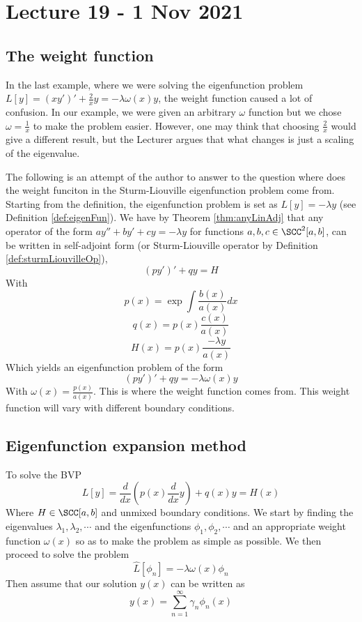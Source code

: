 \section{Lecture 19 - 1 Nov 2021}
\subsection{The weight function}
In the last example, where we were solving the eigenfunction problem
$L[y]=(xy')'+\frac{2}{x}y=-\lambda\omega(x)y$, the weight function caused a lot of
confusion. In our example, we were given an arbitrary $\omega$ function but we chose
$\omega=\frac{1}{x}$ to make the problem easier. However, one may think that choosing
$\frac{2}{x}$ would give a different result, but the Lecturer argues that what changes
is just a scaling of the eigenvalue.

The following is an attempt of the author to answer to the question where does the weight
funciton in the Sturm-Liouville eigenfunction problem come from. 
Starting from the definition, the eigenfunction problem is set as $L[y]=-\lambda y$
(see Definition \ref{def:eigenFun}). We have by Theorem \ref{thm:anyLinAdj} that any
operator of the form $ay''+by'+cy=-\lambda y$ for functions $a,b,c\in \SCC^2[a,b]$,
can be written in self-adjoint form (or Sturm-Liouville operator by Definition
\ref{def:sturmLiouvilleOp}),
\[(py')'+qy=H\]
With 
\[p(x)=\exp{\int\frac{b(x)}{a(x)}dx}\]
\[q(x)=p(x)\frac{c(x)}{a(x)}\]
\[H(x)=p(x)\frac{-\lambda y}{a(x)}\]
Which yields an eigenfunction problem of the form 
\[(py')'+qy=-\lambda \omega(x) y\]
With $\omega(x)=\frac{p(x)}{a(x)}$. This is where the weight function comes from. This
weight function will vary with different boundary conditions. 

\subsection{Eigenfunction expansion method}
To solve the BVP
\[L[y]=\frac{d}{dx}(p(x)\frac{d}{dx}y) + q(x) y = H(x)\]
Where $H\in\SCC[a,b]$ and unmixed boundary conditions. We start by finding the
eigenvalues $\lambda_1,\lambda_2,\cdots$ and the eigenfunctions $\phi_1,\phi_2,\cdots$ and
an appropriate weight function $\omega(x)$ so as to make the problem as simple as
possible. We then proceed to solve the problem
\[\hat{L}[\phi_n]=-\lambda \omega(x) \phi_n\]
Then assume that our solution $y(x)$ can be written as 
\[y(x)=\sum_{n=1}^{\infty} \gamma_n \phi_n(x)\]

